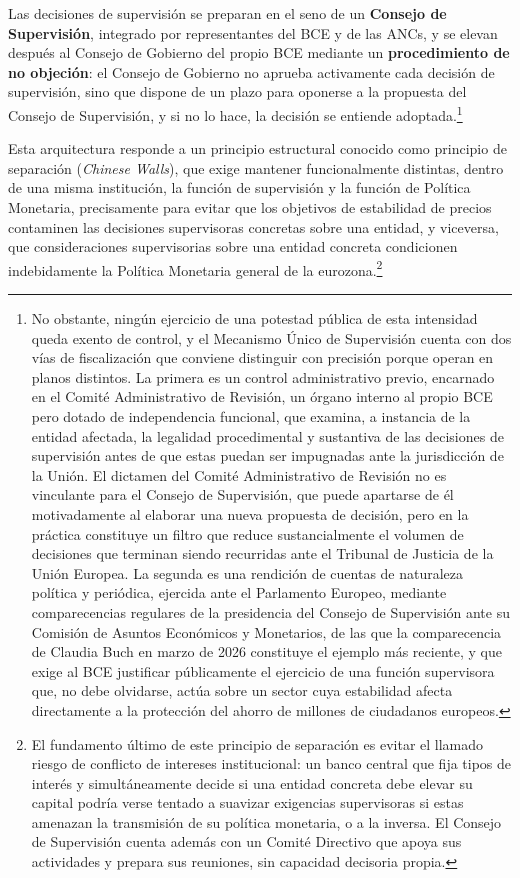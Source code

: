 \documentclass[10pt,a4paper]{article}
\begin{document}
{Las decisiones de supervisión se preparan en el seno de un \textbf{Consejo de Supervisión}, integrado por representantes del BCE y de las ANCs, y se elevan después al Consejo de Gobierno del propio BCE mediante un \textbf{procedimiento de no objeción}: el Consejo de Gobierno no aprueba activamente cada decisión de supervisión, sino que dispone de un plazo para oponerse a la propuesta del Consejo de Supervisión, y si no lo hace, la decisión se entiende adoptada.\footnote{%
    No obstante, ningún ejercicio de una potestad pública de esta intensidad queda exento de control, y el Mecanismo Único de Supervisión cuenta con dos vías de fiscalización que conviene distinguir con precisión porque operan en planos distintos. La primera es un control administrativo previo, encarnado en el Comité Administrativo de Revisión, un órgano interno al propio BCE pero dotado de independencia funcional, que examina, a instancia de la entidad afectada, la legalidad procedimental y sustantiva de las decisiones de supervisión antes de que estas puedan ser impugnadas ante la jurisdicción de la Unión. El dictamen del Comité Administrativo de Revisión no es vinculante para el Consejo de Supervisión, que puede apartarse de él motivadamente al elaborar una nueva propuesta de decisión, pero en la práctica constituye un filtro que reduce sustancialmente el volumen de decisiones que terminan siendo recurridas ante el Tribunal de Justicia de la Unión Europea. La segunda es una rendición de cuentas de naturaleza política y periódica, ejercida ante el Parlamento Europeo, mediante comparecencias regulares de la presidencia del Consejo de Supervisión ante su Comisión de Asuntos Económicos y Monetarios, de las que la comparecencia de Claudia Buch en marzo de 2026 constituye el ejemplo más reciente, y que exige al BCE justificar públicamente el ejercicio de una función supervisora que, no debe olvidarse, actúa sobre un sector cuya estabilidad afecta directamente a la protección del ahorro de millones de ciudadanos europeos.
}

Esta arquitectura responde a un principio estructural conocido como principio de separación (\textit{Chinese Walls}), que exige mantener funcionalmente distintas, dentro de una misma institución, la función de supervisión y la función de Política Monetaria, precisamente para evitar que los objetivos de estabilidad de precios contaminen las decisiones supervisoras concretas sobre una entidad, y viceversa, que consideraciones supervisorias sobre una entidad concreta condicionen indebidamente la Política Monetaria general de la eurozona.\footnote{%
    El fundamento último de este principio de separación es evitar el llamado riesgo de conflicto de intereses institucional: un banco central que fija tipos de interés y simultáneamente decide si una entidad concreta debe elevar su capital podría verse tentado a suavizar exigencias supervisoras si estas amenazan la transmisión de su política monetaria, o a la inversa. El Consejo de Supervisión cuenta además con un Comité Directivo que apoya sus actividades y prepara sus reuniones, sin capacidad decisoria propia.
} 

}
\end{document}
